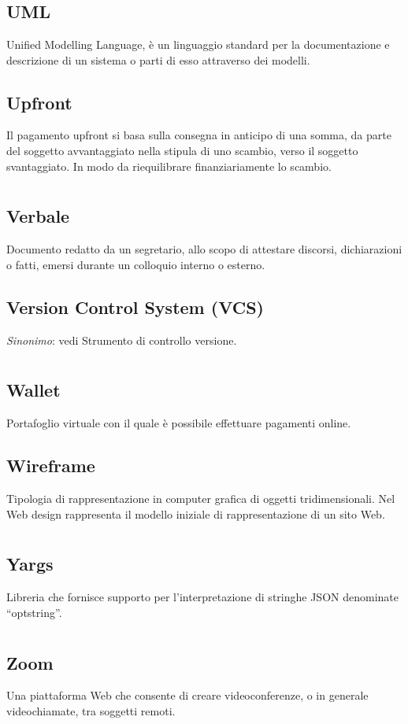 \section[U]{}
	\subsection*{UML}
	Unified Modelling Language, è un linguaggio  standard per la documentazione e descrizione di un sistema o parti di esso attraverso dei modelli.
	\subsection*{Upfront}
	Il pagamento upfront si basa sulla consegna in anticipo di una somma, da parte del soggetto avvantaggiato nella stipula di uno scambio, verso il soggetto svantaggiato. In modo da riequilibrare finanziariamente lo scambio.
\pagebreak
\section[V]{}
	\subsection*{Verbale}
	Documento redatto da un segretario, allo scopo di attestare discorsi, dichiarazioni o fatti, emersi durante un colloquio interno o esterno.
	\subsection*{Version Control System (VCS)}
	\textit{Sinonimo}: vedi Strumento di controllo versione.
\pagebreak
\section[W]{}
	\subsection*{Wallet}
	Portafoglio virtuale con il quale è possibile effettuare pagamenti online.
	\subsection*{Wireframe}
	Tipologia di rappresentazione in computer grafica di oggetti tridimensionali. Nel Web design rappresenta il modello iniziale di rappresentazione di un sito Web.
\pagebreak
\section[Y]{}
	\subsection*{Yargs}
	Libreria che fornisce supporto per l’interpretazione di stringhe JSON denominate “optstring”.
\pagebreak
\section[Z]{}
	\subsection*{Zoom}
	Una piattaforma Web che consente di creare videoconferenze, o in generale videochiamate, tra soggetti remoti.

